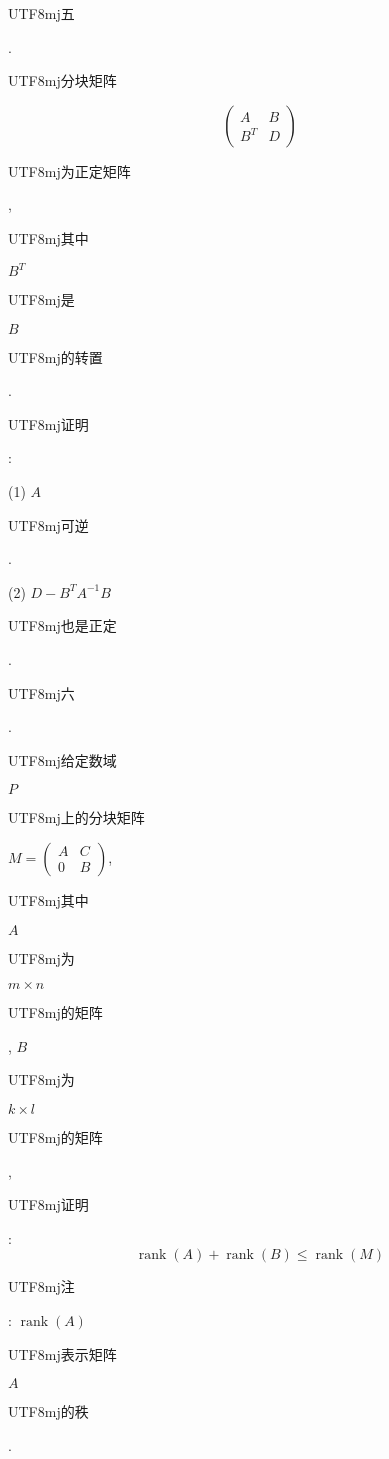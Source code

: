 \documentclass[10pt]{article}
\begin{document}
\begin{CJK}{UTF8}{mj}五\end{CJK}. \begin{CJK}{UTF8}{mj}分块矩阵\end{CJK}
$$
\left(\begin{array}{cc}
A & B \\
B^{T} & D
\end{array}\right)
$$
\begin{CJK}{UTF8}{mj}为正定矩阵\end{CJK}, \begin{CJK}{UTF8}{mj}其中\end{CJK} $B^{T}$ \begin{CJK}{UTF8}{mj}是\end{CJK} $B$ \begin{CJK}{UTF8}{mj}的转置\end{CJK}. \begin{CJK}{UTF8}{mj}证明\end{CJK}:

(1) $A$ \begin{CJK}{UTF8}{mj}可逆\end{CJK}.

(2) $D-B^{T} A^{-1} B$ \begin{CJK}{UTF8}{mj}也是正定\end{CJK}.

\begin{CJK}{UTF8}{mj}六\end{CJK}. \begin{CJK}{UTF8}{mj}给定数域\end{CJK} $P$ \begin{CJK}{UTF8}{mj}上的分块矩阵\end{CJK} $M=\left(\begin{array}{cc}A & C \\ 0 & B\end{array}\right)$, \begin{CJK}{UTF8}{mj}其中\end{CJK} $A$ \begin{CJK}{UTF8}{mj}为\end{CJK} $m \times n$ \begin{CJK}{UTF8}{mj}的矩阵\end{CJK}, $B$ \begin{CJK}{UTF8}{mj}为\end{CJK} $k \times l$ \begin{CJK}{UTF8}{mj}的矩阵\end{CJK}, \begin{CJK}{UTF8}{mj}证明\end{CJK}:
$$
\operatorname{rank}(A)+\operatorname{rank}(B) \leq \operatorname{rank}(M)
$$
\begin{CJK}{UTF8}{mj}注\end{CJK}: $\operatorname{rank}(A)$ \begin{CJK}{UTF8}{mj}表示矩阵\end{CJK} $A$ \begin{CJK}{UTF8}{mj}的秩\end{CJK}.
\end{document}
